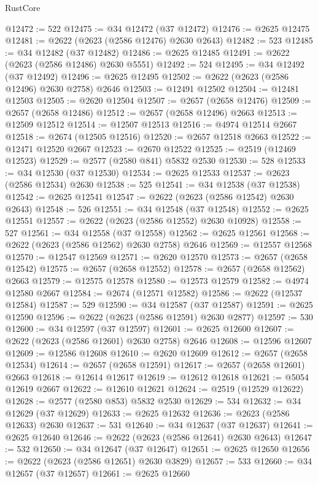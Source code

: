 \begin{lexlean}{RustCore}
\begin{coremodule}
@12472 := 522
@12475 := @34 @12472 (@37 @12472)
@12476 := @2625 @12475
@12481 := @2622 (@2623 (@2586 @12476) @2630 @2643)
@12482 := 523
@12485 := @34 @12482 (@37 @12482)
@12486 := @2625 @12485
@12491 := @2622 (@2623 (@2586 @12486) @2630 @5551)
@12492 := 524
@12495 := @34 @12492 (@37 @12492)
@12496 := @2625 @12495
@12502 := @2622 (@2623 (@2586 @12496) @2630 @2758) @2646
@12503 := @12491 @12502
@12504 := @12481 @12503
@12505 := @2620 @12504
@12507 := @2657 (@2658 @12476)
@12509 := @2657 (@2658 @12486)
@12512 := @2657 (@2658 @12496) @2663
@12513 := @12509 @12512
@12514 := @12507 @12513
@12516 := @4974 @12514 @2667
@12518 := @2674 (@12505 @12516)
@12520 := @2657 @12518 @2663
@12522 := @12471 @12520 @2667
@12523 := @2670 @12522
@12525 := @2519 (@12469 @12523)
@12529 := @2577 (@2580 @841) @5832 @2530
@12530 := 528
@12533 := @34 @12530 (@37 @12530)
@12534 := @2625 @12533
@12537 := @2623 (@2586 @12534) @2630
@12538 := 525
@12541 := @34 @12538 (@37 @12538)
@12542 := @2625 @12541
@12547 := @2622 (@2623 (@2586 @12542) @2630 @2643)
@12548 := 526
@12551 := @34 @12548 (@37 @12548)
@12552 := @2625 @12551
@12557 := @2622 (@2623 (@2586 @12552) @2630 @10928)
@12558 := 527
@12561 := @34 @12558 (@37 @12558)
@12562 := @2625 @12561
@12568 := @2622 (@2623 (@2586 @12562) @2630 @2758) @2646
@12569 := @12557 @12568
@12570 := @12547 @12569
@12571 := @2620 @12570
@12573 := @2657 (@2658 @12542)
@12575 := @2657 (@2658 @12552)
@12578 := @2657 (@2658 @12562) @2663
@12579 := @12575 @12578
@12580 := @12573 @12579
@12582 := @4974 @12580 @2667
@12584 := @2674 (@12571 @12582)
@12586 := @2622 (@12537 @12584)
@12587 := 529
@12590 := @34 @12587 (@37 @12587)
@12591 := @2625 @12590
@12596 := @2622 (@2623 (@2586 @12591) @2630 @2877)
@12597 := 530
@12600 := @34 @12597 (@37 @12597)
@12601 := @2625 @12600
@12607 := @2622 (@2623 (@2586 @12601) @2630 @2758) @2646
@12608 := @12596 @12607
@12609 := @12586 @12608
@12610 := @2620 @12609
@12612 := @2657 (@2658 @12534)
@12614 := @2657 (@2658 @12591)
@12617 := @2657 (@2658 @12601) @2663
@12618 := @12614 @12617
@12619 := @12612 @12618
@12621 := @5054 @12619 @2667
@12622 := @12610 @12621
@12624 := @2519 (@12529 @12622)
@12628 := @2577 (@2580 @853) @5832 @2530
@12629 := 534
@12632 := @34 @12629 (@37 @12629)
@12633 := @2625 @12632
@12636 := @2623 (@2586 @12633) @2630
@12637 := 531
@12640 := @34 @12637 (@37 @12637)
@12641 := @2625 @12640
@12646 := @2622 (@2623 (@2586 @12641) @2630 @2643)
@12647 := 532
@12650 := @34 @12647 (@37 @12647)
@12651 := @2625 @12650
@12656 := @2622 (@2623 (@2586 @12651) @2630 @3829)
@12657 := 533
@12660 := @34 @12657 (@37 @12657)
@12661 := @2625 @12660

\end{coremodule}
\end{lexlean}
